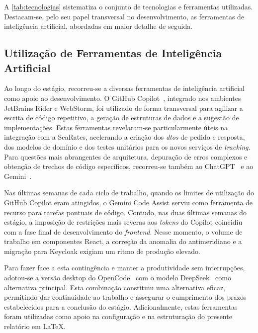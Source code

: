 A \autoref{tab:tecnologias} sistematiza o conjunto de tecnologias e ferramentas utilizadas. Destacam-se, pelo seu papel transversal no desenvolvimento, as ferramentas de inteligência artificial, abordadas em maior detalhe de seguida.

\subsection{Utilização de Ferramentas de Inteligência Artificial}\label{sec:ia}

Ao longo do estágio, recorreu-se a diversas ferramentas de inteligência artificial como apoio ao desenvolvimento. O GitHub Copilot~\cite{copilot}, integrado nos ambientes JetBrains Rider e WebStorm, foi utilizado de forma transversal para agilizar a escrita de código repetitivo, a geração de estruturas de dados e a sugestão de implementações. Estas ferramentas revelaram-se particularmente úteis na integração com a SeaRates, acelerando a criação dos \textit{\glspl{dto}} de pedido e resposta, dos modelos de domínio e dos testes unitários para os novos serviços de \textit{tracking}. Para questões mais abrangentes de arquitetura, depuração de erros complexos e obtenção de trechos de código específicos, recorreu-se também ao ChatGPT~\cite{chatgpt} e ao Gemini~\cite{gemini}.

Nas últimas semanas de cada ciclo de trabalho, quando os limites de utilização do GitHub Copilot eram atingidos, o Gemini Code Assist serviu como ferramenta de recurso para tarefas pontuais de código. Contudo, nas duas últimas semanas do estágio, a imposição de restrições mais severas aos \textit{tokens} do Copilot coincidiu com a fase final de desenvolvimento do \textit{frontend}. Nesse momento, o volume de trabalho em componentes React, a correção da anomalia do antimeridiano e a migração para Keycloak exigiam um ritmo de produção elevado.

Para fazer face a esta contingência e manter a produtividade sem interrupções, adotou-se a versão desktop do OpenCode~\cite{opencode} com o modelo DeepSeek~\cite{deepseek} como alternativa principal. Esta combinação constituiu uma alternativa eficaz, permitindo dar continuidade ao trabalho e assegurar o cumprimento dos prazos estabelecidos para a conclusão do estágio. Adicionalmente, estas ferramentas foram utilizadas como apoio na configuração e na estruturação do presente relatório em LaTeX.

